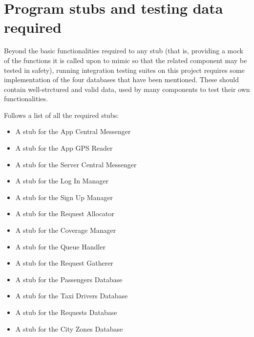 \chapter{Program stubs and testing data required}
Beyond the basic functionalities required to any stub (that is, providing a mock of the functions it is called upon to mimic so that the related component may be tested in safety), running integration testing suites on this project requires some implementation of the four databases that have been mentioned. These should contain well-strctured and valid data, used by many components to test their own functionalities.

Follows a list of all the required stubs:
\begin{itemize}
							\item A stub for the App Central Messenger
							\item A stub for the App GPS Reader
							\item A stub for the Server Central Messenger
							\item A stub for the Log In Manager
							\item A stub for the Sign Up Manager
							\item A stub for the Request Allocator
							\item A stub for the Coverage Manager
							\item A stub for the Queue Handler
							\item A stub for the Request Gatherer
							\item A stub for the Passengers Database
							\item A stub for the Taxi Drivers Database
							\item A stub for the Requests Database
							\item A stub for the City Zones Database							
\end{itemize}

